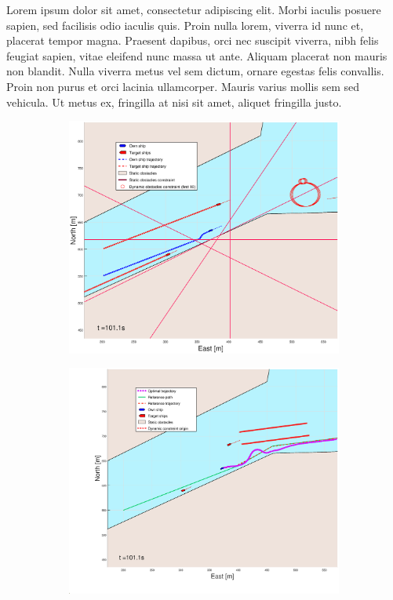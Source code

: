 Lorem ipsum dolor sit amet, consectetur adipiscing elit. Morbi iaculis posuere sapien, sed facilisis odio iaculis quis. 
Proin nulla lorem, viverra id nunc et, placerat tempor magna. Praesent dapibus, orci nec suscipit viverra, nibh felis feugiat sapien, 
vitae eleifend nunc massa ut ante. Aliquam placerat non mauris non blandit. Nulla viverra metus vel sem dictum, ornare egestas felis convallis. 
Proin non purus et orci lacinia ullamcorper. Mauris varius mollis sem sed vehicula. Ut metus ex, fringilla at nisi sit amet, aliquet fringilla justo.

\begin{figure}[!ht] %
    \begin{subfigure}[b]{0.49\textwidth}
        \centering
        \includegraphics[width=\textwidth]{Images/Figures/Trheimfjord/_Simple_1fig1_time=101}
    \end{subfigure}
    \hfill
    \begin{subfigure}[b]{0.499\textwidth}
        \centering
        \includegraphics[width=\textwidth]{Images/Figures/Trheimfjord/_Simple_1fig999_time=101}

\end{subfigure}
\end{figure}
